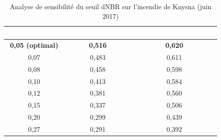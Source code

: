 \begin{table}[H]
\centering
\caption{Analyse de sensibilité du seuil dNBR sur l'incendie de Knysna (juin 2017)}
\begin{tabular}{|c|c|c|}
\hline
\rowcolor{NavyBlue} \textcolor{white}{\textbf{Seuil dNBR ($T$)}} & \textcolor{white}{\textbf{IoU strict (exact)}} & \textcolor{white}{\textbf{IoU généreux ($\sim$200\,m)}} \\
\hline
\textbf{0,05 (optimal)} & \textbf{0,516} & \textbf{0,620} \\
0,07 & 0,483 & 0,611 \\
0,08 & 0,458 & 0,598 \\
0,10 & 0,413 & 0,584 \\
0,12 & 0,381 & 0,560 \\
0,15 & 0,337 & 0,506 \\
0,20 & 0,299 & 0,439 \\
0,27 & 0,291 & 0,392 \\
\hline
\end{tabular}
\end{table}



